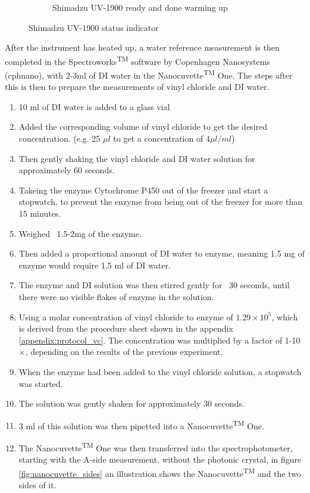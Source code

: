\documentclass{article}
\begin{document}
\begin{figure}[H]
\begin{subfigure}[b]{0.48\textwidth}
       \caption{Shimadzu UV-1900 ready and done warming up}
       \label{fig:shimadzu_ready}
    \end{subfigure}
    \caption{Shimadzu UV-1900 status indicator}
    \label{fig:shimadzu_status}
\end{figure}

After the instrument has heated up, a water reference measurement is then completed in the Spectroworks\textsuperscript{TM} software by Copenhagen Nanosystems (cphnano), with 2-3ml of DI water in the Nanocuvette\textsuperscript{TM} One.
The steps after this is then to prepare the measurements of vinyl chloride and DI water.

\begin{enumerate}
    \item 10 ml of DI water is added to a glass vial
    \item Added the corresponding volume of vinyl chloride to get the desired concentration. (e.g. 25 $\mu l$ to get a concentration of $ 4 \mu l / ml $)
    \item Then gently shaking the vinyl chloride and DI water solution for approximately 60 seconds.
    \item Takeing the enzyme Cytochrome P450 out of the freezer and start a stopwatch, to prevent the enzyme from being out of the freezer for more than 15 minutes.
    \item Weighed ~1.5-2mg of the enzyme.
    \item Then added a proportional amount of DI water to enzyme, meaning 1.5 mg of enzyme would require 1.5 ml of DI water.
    \item The enzyme and DI solution was then stirred gently for ~30 seconds, until there were no visible flakes of enzyme in the solution.
    \item Using a molar concentration of vinyl chloride to enzyme of $1.29 \times 10^5$, which is derived from the procedure sheet shown in the appendix \ref{appendix:protocol_vc}. The concentration was multiplied by a factor of 1-10$\times$, depending on the results of the previous experiment.
    \item When the enzyme had been added to the vinyl chloride solution, a stopwatch was started.
    \item The solution was gently shaken for approximately 30 seconds.
    \item 3 ml of this solution was then pipetted into a Nanocuvette\textsuperscript{TM} One.
    \item The Nanocuvette\textsuperscript{TM} One was then transferred into the spectrophotometer, starting with the A-side measurement, without the photonic crystal, in figure \ref{fig:nanocuvette_sides} an illustration shows the Nanocuvette\textsuperscript{TM} and the two sides of it.\label{step:measurement_start}


\end{enumerate}
\end{document}
